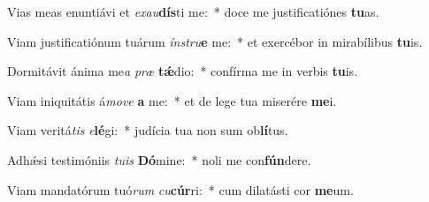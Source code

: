 \item Vias meas enuntiávi et \textit{ex}\textit{au}\textbf{dís}ti me:~* doce me justificatiónes \textbf{tu}as.
\item Viam justificatiónum tuárum \textit{ín}\textit{stru}\textbf{e} me:~* et exercébor in mirabílibus \textbf{tu}is.
\item Dormitávit ánima me\textit{a} \textit{præ} \textbf{tǽ}dio:~* confírma me in verbis \textbf{tu}is.
\item Viam iniquitátis á\textit{mo}\textit{ve} \textbf{a} me:~* et de lege tua miserére \textbf{me}i.
\item Viam veritá\textit{tis} \textit{e}\textbf{lé}gi:~* judícia tua non sum ob\textbf{lí}tus.
\item Adhǽsi testimóniis \textit{tu}\textit{is} \textbf{Dó}mine:~* noli me con\textbf{fún}dere.
\item Viam mandatórum tuó\textit{rum} \textit{cu}\textbf{cúr}ri:~* cum dilatásti cor \textbf{me}um.
